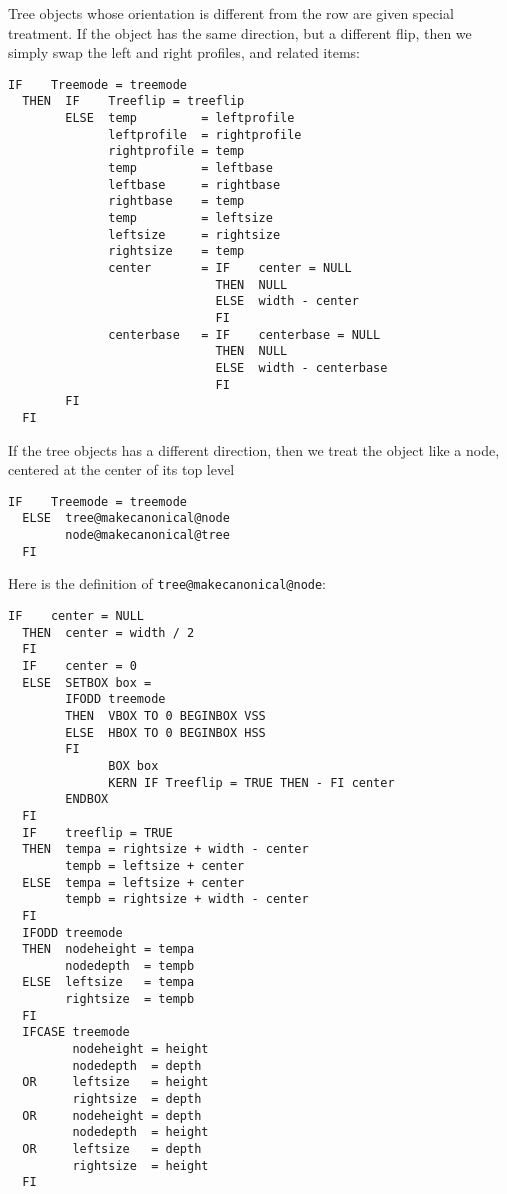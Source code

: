 \documentclass[11pt,english,BCOR10mm,DIV12,bibliography=totoc,parskip=false,smallheadings
    headexclude,footexclude,oneside]{pst-doc}
\begin{document}
Tree objects whose orientation is different from the row are given special treatment. If the object 
has the same direction, but a different flip, then we simply swap the left and right profiles, and related items:
\begin{lstlisting}[style=syntax]
  IF    Treemode = treemode
  THEN  IF    Treeflip = treeflip
        ELSE  temp         = leftprofile
              leftprofile  = rightprofile
              rightprofile = temp
              temp         = leftbase
              leftbase     = rightbase
              rightbase    = temp
              temp         = leftsize
              leftsize     = rightsize
              rightsize    = temp
              center       = IF    center = NULL
                             THEN  NULL
                             ELSE  width - center
                             FI
              centerbase   = IF    centerbase = NULL
                             THEN  NULL
                             ELSE  width - centerbase
                             FI
        FI
  FI
\end{lstlisting}

If the tree objects has a different direction, then we treat the object like a node, centered at the center of its top level
\begin{lstlisting}[style=syntax]
  IF    Treemode = treemode
  ELSE  tree@makecanonical@node
        node@makecanonical@tree
  FI
\end{lstlisting}

Here is the definition of \verb=tree@makecanonical@node=:

\begin{lstlisting}[style=syntax]
  IF    center = NULL
  THEN  center = width / 2
  FI
  IF    center = 0
  ELSE  SETBOX box =
        IFODD treemode
        THEN  VBOX TO 0 BEGINBOX VSS
        ELSE  HBOX TO 0 BEGINBOX HSS
        FI
              BOX box
              KERN IF Treeflip = TRUE THEN - FI center
        ENDBOX
  FI
  IF    treeflip = TRUE
  THEN  tempa = rightsize + width - center
        tempb = leftsize + center
  ELSE  tempa = leftsize + center
        tempb = rightsize + width - center
  FI
  IFODD treemode
  THEN  nodeheight = tempa
        nodedepth  = tempb
  ELSE  leftsize   = tempa
        rightsize  = tempb
  FI
  IFCASE treemode
         nodeheight = height
         nodedepth  = depth
  OR     leftsize   = height
         rightsize  = depth
  OR     nodeheight = depth
         nodedepth  = height
  OR     leftsize   = depth
         rightsize  = height
  FI
\end{lstlisting}
\end{document}
